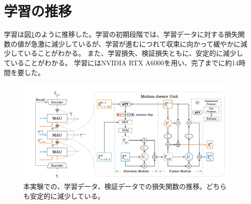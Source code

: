   \section{学習の推移}
  学習は図\ref{fig:exp1_learn_progress}のように推移した。学習の初期段階では、学習データに対する損失関数の値が急激に減少しているが、学習が進むにつれて収束に向かって緩やかに減少していることがわかる。
  また、学習損失、検証損失ともに、安定的に減少していることがわかる。
  学習にはNVIDIA RTX A6000を用い、完了までに約14時間を要した。
  \begin{figure}[htpb]
    \centering
    \includegraphics[width=\textwidth]{figures/mau.png}
    \caption{本実験での、学習データ、検証データでの損失関数の推移。どちらも安定的に減少している。}
    \label{fig:exp1_learn_progress}
  \end{figure}

